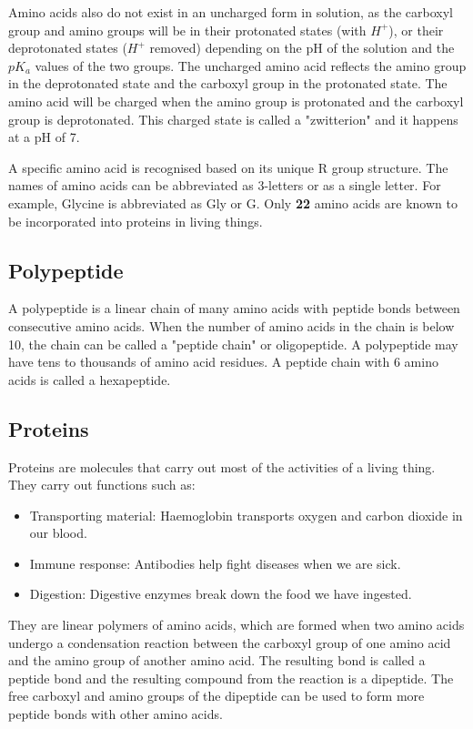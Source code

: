 \documentclass[11pt]{article}
\begin{document}
Amino acids also do not exist in an uncharged form in solution, as the carboxyl group and amino groups will be in their protonated states (with \(H^+\)), or their deprotonated states (\(H^+\) removed) depending on the pH of the solution and the \(pK_a\) values of the two groups. The uncharged amino acid reflects the amino group in the deprotonated state and the carboxyl group in the protonated state. The amino acid will be charged when the amino group is protonated and the carboxyl group is deprotonated. This charged state is called a "zwitterion" and it happens at a pH of 7.


A specific amino acid is recognised based on its unique R group structure. The names of amino acids can be abbreviated as 3-letters or as a single letter. For example, Glycine is abbreviated as Gly or G. Only \textbf{22} amino acids are known to be incorporated into proteins in living things.
\subsection{Polypeptide}
\label{sec:orgb9fb1b0}
A polypeptide is a linear chain of many amino acids with peptide bonds between consecutive amino acids. When the number of amino acids in the chain is below 10, the chain can be called a "peptide chain" or oligopeptide. A polypeptide may have tens to thousands of amino acid residues. A peptide chain with 6 amino acids is called a hexapeptide.

\newpage
\subsection{Proteins}
\label{sec:org34426ca}
Proteins are molecules that carry out most of the activities of a living thing. They carry out functions such as:
\begin{itemize}
\item Transporting material: Haemoglobin transports oxygen and carbon dioxide in our blood.
\item Immune response: Antibodies help fight diseases when we are sick.
\item Digestion: Digestive enzymes break down the food we have ingested.
\end{itemize}

They are linear polymers of amino acids, which are formed when two amino acids undergo a condensation reaction between the carboxyl group of one amino acid and the amino group of another amino acid. The resulting bond is called a peptide bond and the resulting compound from the reaction is a dipeptide. The free carboxyl and amino groups of the dipeptide can be used to form more peptide bonds with other amino acids.
\end{document}
